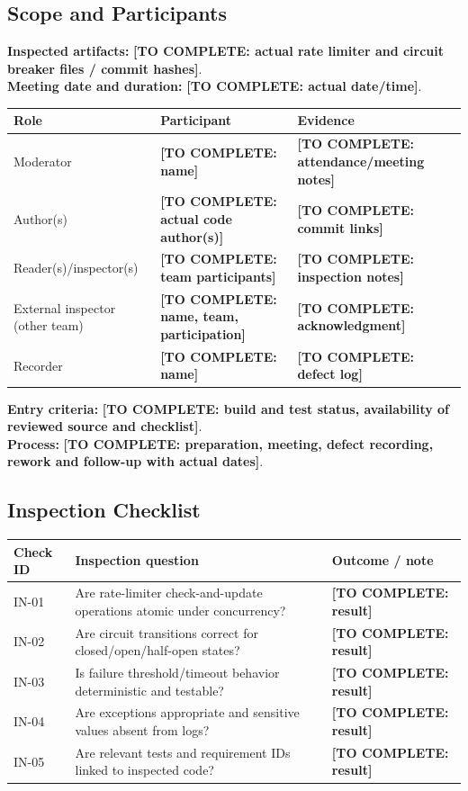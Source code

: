 \documentclass[11pt,a4paper]{article}
\newcommand{\todo}[1]{\textcolor{red!70!black}{\textbf{[TO COMPLETE: #1]}}}
\begin{document}
\subsection{Scope and Participants}
\textbf{Inspected artifacts:} \todo{actual rate limiter and circuit breaker files / commit hashes}.\\
\textbf{Meeting date and duration:} \todo{actual date/time}.\\
\begin{longtable}{L{3.8cm} L{4.7cm} L{4cm}}\toprule
\textbf{Role} & \textbf{Participant} & \textbf{Evidence}\\\midrule\endhead
Moderator & \todo{name} & \todo{attendance/meeting notes}\\
Author(s) & \todo{actual code author(s)} & \todo{commit links}\\
Reader(s)/inspector(s) & \todo{team participants} & \todo{inspection notes}\\
External inspector (other team) & \todo{name, team, participation} & \todo{acknowledgment}\\
Recorder & \todo{name} & \todo{defect log}\\\bottomrule\end{longtable}
\textbf{Entry criteria:} \todo{build and test status, availability of reviewed source and checklist}.\\
\textbf{Process:} \todo{preparation, meeting, defect recording, rework and follow-up with actual dates}.
\subsection{Inspection Checklist}
\begin{longtable}{L{2cm} L{8.5cm} L{2.5cm}}\toprule
\textbf{Check ID} & \textbf{Inspection question} & \textbf{Outcome / note}\\\midrule\endhead
IN-01 & Are rate-limiter check-and-update operations atomic under concurrency? & \todo{result}\\
IN-02 & Are circuit transitions correct for closed/open/half-open states? & \todo{result}\\
IN-03 & Is failure threshold/timeout behavior deterministic and testable? & \todo{result}\\
IN-04 & Are exceptions appropriate and sensitive values absent from logs? & \todo{result}\\
IN-05 & Are relevant tests and requirement IDs linked to inspected code? & \todo{result}\\\bottomrule\end{longtable}
\end{document}

